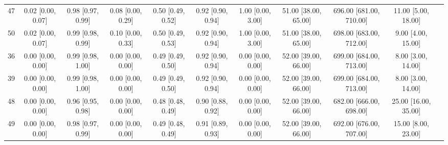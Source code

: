 \documentclass[8pt]{article}
\begin{document}
\begin{center}
\begin{footnotesize}
\begin{longtable}{|ccccccccccc|}
 47 &  0.02 [0.00, 0.07] &  0.98 [0.97, 0.99] &  0.08 [0.00, 0.29] &  0.50 [0.49, 0.52] &  0.92 [0.90, 0.94] &     1.00 [0.00, 3.00] &  51.00 [38.00, 65.00] &  696.00 [681.00, 710.00] &      11.00 [5.00, 18.00] \\
 50 &  0.02 [0.00, 0.07] &  0.99 [0.98, 0.99] &  0.10 [0.00, 0.33] &  0.50 [0.49, 0.53] &  0.92 [0.90, 0.94] &     1.00 [0.00, 3.00] &  51.00 [38.00, 65.00] &  698.00 [683.00, 712.00] &       9.00 [4.00, 15.00] \\
 36 &  0.00 [0.00, 0.00] &  0.99 [0.98, 1.00] &  0.00 [0.00, 0.00] &  0.49 [0.49, 0.50] &  0.92 [0.90, 0.94] &     0.00 [0.00, 0.00] &  52.00 [39.00, 66.00] &  699.00 [684.00, 713.00] &       8.00 [3.00, 14.00] \\
 39 &  0.00 [0.00, 0.00] &  0.99 [0.98, 1.00] &  0.00 [0.00, 0.00] &  0.49 [0.49, 0.50] &  0.92 [0.90, 0.94] &     0.00 [0.00, 0.00] &  52.00 [39.00, 66.00] &  699.00 [684.00, 713.00] &       8.00 [3.00, 14.00] \\
 48 &  0.00 [0.00, 0.00] &  0.96 [0.95, 0.98] &  0.00 [0.00, 0.00] &  0.48 [0.48, 0.49] &  0.90 [0.88, 0.92] &     0.00 [0.00, 0.00] &  52.00 [39.00, 66.00] &  682.00 [666.00, 698.00] &     25.00 [16.00, 35.00] \\
 49 &  0.00 [0.00, 0.00] &  0.98 [0.97, 0.99] &  0.00 [0.00, 0.00] &  0.49 [0.48, 0.49] &  0.91 [0.89, 0.93] &     0.00 [0.00, 0.00] &  52.00 [39.00, 66.00] &  692.00 [676.00, 707.00] &      15.00 [8.00, 23.00] \\
\end{longtable}
\end{footnotesize}
\end{center}
\end{document}
